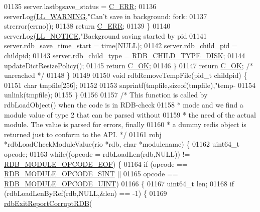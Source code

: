 \begin{DoxyCode}
{{{{{{{{{{{{{{{{01135             server.lastbgsave\_status = \hyperlink{server_8h_af98ac28d5f4d23d7ed5985188e6fb7d1}{C\_ERR};
01136             serverLog(\hyperlink{server_8h_a31229b9334bba7d6be2a72970967a14b}{LL\_WARNING},\textcolor{stringliteral}{"Can't save in background: fork: %
01137                 strerror(errno));
01138             \textcolor{keywordflow}{return} \hyperlink{server_8h_af98ac28d5f4d23d7ed5985188e6fb7d1}{C\_ERR};
01139         \}
01140         serverLog(\hyperlink{server_8h_a8c54c191e436c7dd3012167212692401}{LL\_NOTICE},\textcolor{stringliteral}{"Background saving started by pid %
01141         server.rdb\_save\_time\_start = time(NULL);
01142         server.rdb\_child\_pid = childpid;
01143         server.rdb\_child\_type = \hyperlink{server_8h_a9d886e992717fa246dd7954244ff6bdf}{RDB\_CHILD\_TYPE\_DISK};
01144         updateDictResizePolicy();
01145         \textcolor{keywordflow}{return} \hyperlink{server_8h_a303769ef1065076e68731584e758d3e1}{C\_OK};
01146     \}
01147     \textcolor{keywordflow}{return} \hyperlink{server_8h_a303769ef1065076e68731584e758d3e1}{C\_OK}; \textcolor{comment}{/* unreached */}
01148 \}
01149 
01150 \textcolor{keywordtype}{void} rdbRemoveTempFile(pid\_t childpid) \{
01151     \textcolor{keywordtype}{char} tmpfile[256];
01152 
01153     snprintf(tmpfile,\textcolor{keyword}{sizeof}(tmpfile),\textcolor{stringliteral}{"temp-%
01154     unlink(tmpfile);
01155 \}
01156 
01157 \textcolor{comment}{/* This function is called by rdbLoadObject() when the code is in RDB-check}
01158 \textcolor{comment}{ * mode and we find a module value of type 2 that can be parsed without}
01159 \textcolor{comment}{ * the need of the actual module. The value is parsed for errors, finally}
01160 \textcolor{comment}{ * a dummy redis object is returned just to conform to the API. */}
01161 robj *rdbLoadCheckModuleValue(rio *rdb, \textcolor{keywordtype}{char} *modulename) \{
01162     uint64\_t opcode;
01163     \textcolor{keywordflow}{while}((opcode = rdbLoadLen(rdb,NULL)) != \hyperlink{rdb_8h_a905d414d752c18bdea4cf67b498fee52}{RDB\_MODULE\_OPCODE\_EOF}) \{
01164         \textcolor{keywordflow}{if} (opcode == \hyperlink{rdb_8h_a687c158b5c4c8a139b8980145f4aec5d}{RDB\_MODULE\_OPCODE\_SINT} ||
01165             opcode == \hyperlink{rdb_8h_a51400e437b171bb1d6206058b48e9938}{RDB\_MODULE\_OPCODE\_UINT})
01166         \{
01167             uint64\_t len;
01168             \textcolor{keywordflow}{if} (rdbLoadLenByRef(rdb,NULL,&len) == -1) \{
01169                 \hyperlink{rdb_8c_afb34e310c0e5dfd9f8c2bebbec59c7f7}{rdbExitReportCorruptRDB}(
}}}}}}}}}}}}}}}}}}}
\end{DoxyCode}
